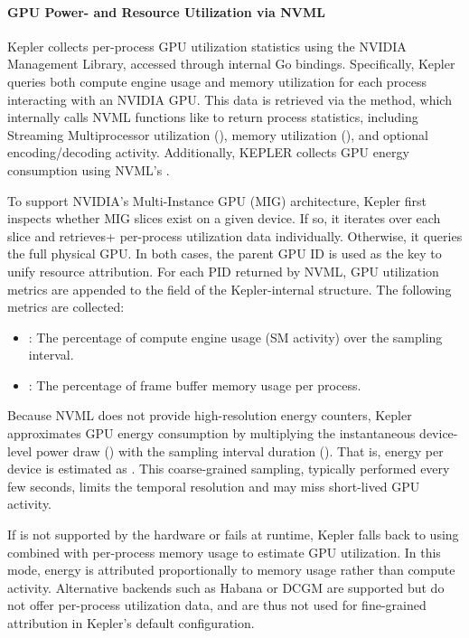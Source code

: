 \paragraph{GPU Power- and Resource Utilization via NVML}

Kepler collects per-process GPU utilization statistics using the NVIDIA Management Library, accessed through internal Go bindings. Specifically, Kepler queries both compute engine usage and memory utilization for each process interacting with an NVIDIA GPU. This data is retrieved via the  method, which internally calls NVML functions like  to return process statistics, including Streaming Multiprocessor utilization (), memory utilization (), and optional encoding/decoding activity. Additionally, KEPLER collects GPU energy consumption using NVML's .

To support NVIDIA's Multi-Instance GPU (MIG) architecture, Kepler first inspects whether MIG slices exist on a given device. If so, it iterates over each slice and retrieves+ per-process utilization data individually. Otherwise, it queries the full physical GPU. In both cases, the parent GPU ID is used as the key to unify resource attribution. For each PID returned by NVML, GPU utilization metrics are appended to the  field of the Kepler-internal  structure. The following metrics are collected:
\begin{itemize}
  \item {}: The percentage of compute engine usage (SM activity) over the sampling interval.
  \item {}: The percentage of frame buffer memory usage per process.
\end{itemize}

Because NVML does not provide high-resolution energy counters, Kepler approximates GPU energy consumption by multiplying the instantaneous device-level power draw () with the sampling interval duration (). That is, energy per device is estimated as . This coarse-grained sampling, typically performed every few seconds, limits the temporal resolution and may miss short-lived GPU activity.

If  is not supported by the hardware or fails at runtime, Kepler falls back to using  combined with per-process memory usage to estimate GPU utilization. In this mode, energy is attributed proportionally to memory usage rather than compute activity. Alternative backends such as Habana or DCGM are supported but do not offer per-process utilization data, and are thus not used for fine-grained attribution in Kepler’s default configuration.

